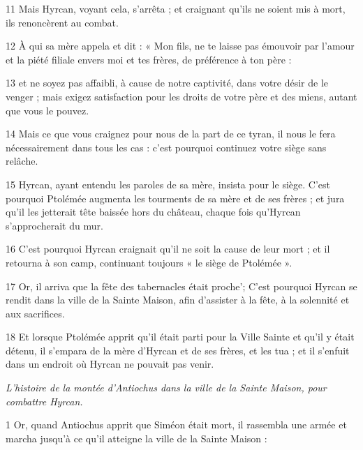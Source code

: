 \par 11 Mais Hyrcan, voyant cela, s'arrêta ; et craignant qu'ils ne soient mis à mort, ils renoncèrent au combat.

\par 12 À qui sa mère appela et dit : « Mon fils, ne te laisse pas émouvoir par l'amour et la piété filiale envers moi et tes frères, de préférence à ton père :

\par 13 et ne soyez pas affaibli, à cause de notre captivité, dans votre désir de le venger ; mais exigez satisfaction pour les droits de votre père et des miens, autant que vous le pouvez.

\par 14 Mais ce que vous craignez pour nous de la part de ce tyran, il nous le fera nécessairement dans tous les cas : c'est pourquoi continuez votre siège sans relâche.

\par 15 Hyrcan, ayant entendu les paroles de sa mère, insista pour le siège. C'est pourquoi Ptolémée augmenta les tourments de sa mère et de ses frères ; et jura qu'il les jetterait tête baissée hors du château, chaque fois qu'Hyrcan s'approcherait du mur.

\par 16 C'est pourquoi Hyrcan craignait qu'il ne soit la cause de leur mort ; et il retourna à son camp, continuant toujours « le siège de Ptolémée ».

\par 17 Or, il arriva que la fête des tabernacles était proche'; C'est pourquoi Hyrcan se rendit dans la ville de la Sainte Maison, afin d'assister à la fête, à la solennité et aux sacrifices.

\par 18 Et lorsque Ptolémée apprit qu'il était parti pour la Ville Sainte et qu'il y était détenu, il s'empara de la mère d'Hyrcan et de ses frères, et les tua ; et il s'enfuit dans un endroit où Hyrcan ne pouvait pas venir.




\par \textit{L'histoire de la montée d'Antiochus dans la ville de la Sainte Maison, pour combattre Hyrcan.}

\par 1 Or, quand Antiochus apprit que Siméon était mort, il rassembla une armée et marcha jusqu'à ce qu'il atteigne la ville de la Sainte Maison :

